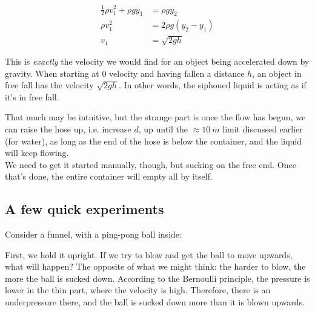 \begin{align}
\frac{1}{2} \rho v_1^2 + \rho g y_1 &= \rho g y_2\\
\rho v_1^2 &= 2 \rho g (y_2 - y_1)\\
v_1 &= \sqrt{2 g h}
\end{align}

This is \emph{exactly} the velocity we would find for an object being accelerated down by gravity. When starting at 0 velocity and having fallen a distance $h$, an object in free fall has the velocity $\sqrt{2 g h}$. In other words, the siphoned liquid is acting as if it's in free fall.

That much may be intuitive, but the strange part is once the flow has begun, we can raise the hose up, i.e. increase $d$, up until the $\approx \SI{10}{m}$ limit discussed earlier (for water), as long as the end of the hose is below the container, and the liquid will keep flowing.\\
We need to get it started manually, though, but sucking on the free end. Once that's done, the entire container will empty all by itself.

\subsection{A few quick experiments}

Consider a funnel, with a ping-pong ball inside:

\begin{figure}[H]
\centering
{}%
\end{figure}


First, we hold it upright. If we try to blow and get the ball to move upwards, what will happen? The opposite of what we might think: the harder to blow, the more the ball is sucked down. According to the Bernoulli principle, the pressure is lower in the thin part, where the velocity is high. Therefore, there is an underpressure there, and the ball is sucked down more than it is blown upwards.

